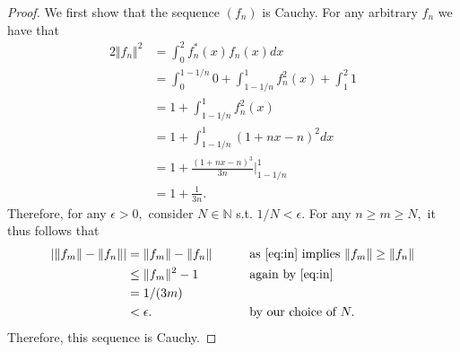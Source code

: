 \documentclass[10pt]{article}
\begin{document}
\begin{proof}
    We first show that the sequence $(f_n)$ is Cauchy. For any arbitrary $f_n$ we have that
    \begin{alignat}{2}
        \Vert f_n \Vert^2 &= \int_{0}^{2}f_n^*(x)f_n(x)dx \nonumber\\
        &= \int_{0}^{1-1/n}0 +\int_{1-1/n}^{1}f_n^2(x) + \int_{1}^{2}1\nonumber\\
        &= 1 + \int_{1-1/n}^{1}f_n^2(x)\nonumber\\
        &= 1 + \int_{1-1/n}^{1} (1 +nx-n)^2dx\nonumber\\
        &= 1 + \frac{(1+nx-n)^3}{3n} \Bigg\vert_{1-1/n}^1\nonumber\\
        &= 1 + \frac{1}{3n}. \label{eq:in}
    \end{alignat}
    Therefore, for any $\epsilon > 0,$ consider $N\in\mathbb{N}$ s.t. $1/N < \epsilon.$ For any $n\ge m \ge N,$ it thus follows that
    \begin{alignat*}{2}
        | \Vert f_m\Vert - \Vert f_n\Vert | &= \Vert f_m\Vert - \Vert f_n\Vert \qquad&&\text{as \eqref{eq:in} implies $\Vert f_m\Vert \ge \Vert f_n\Vert$}\\
        &\le \Vert f_m\Vert^2 - 1 &&\text{again by \eqref{eq:in}}\\
        &= 1/(3m)\\
        &<\epsilon. &&\text{by our choice of $N.$}
    \end{alignat*}
    Therefore, this sequence is Cauchy.


\end{proof}
\end{document}
